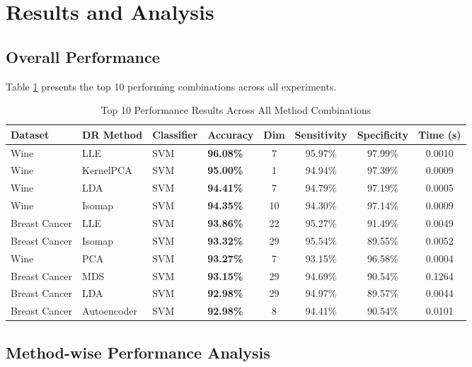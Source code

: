 \documentclass[12pt,a4paper]{article}
\begin{document}
\section{Results and Analysis}

\subsection{Overall Performance}

Table \ref{tab:top_results} presents the top 10 performing combinations across all experiments.

\begin{table}[H]
\centering
\caption{Top 10 Performance Results Across All Method Combinations}
\label{tab:top_results}
\scriptsize
\begin{tabular}{llllcccc}
\toprule
\textbf{Dataset} & \textbf{DR Method} & \textbf{Classifier} & \textbf{Accuracy} & \textbf{Dim} & \textbf{Sensitivity} & \textbf{Specificity} & \textbf{Time (s)} \\
\midrule
Wine & LLE & SVM & \textbf{96.08\%} & 7 & 95.97\% & 97.99\% & 0.0010 \\
Wine & KernelPCA & SVM & \textbf{95.00\%} & 1 & 94.94\% & 97.39\% & 0.0009 \\
Wine & LDA & SVM & \textbf{94.41\%} & 7 & 94.79\% & 97.19\% & 0.0005 \\
Wine & Isomap & SVM & \textbf{94.35\%} & 10 & 94.30\% & 97.14\% & 0.0009 \\
Breast Cancer & LLE & SVM & \textbf{93.86\%} & 22 & 95.27\% & 91.49\% & 0.0049 \\
Breast Cancer & Isomap & SVM & \textbf{93.32\%} & 29 & 95.54\% & 89.55\% & 0.0052 \\
Wine & PCA & SVM & \textbf{93.27\%} & 7 & 93.15\% & 96.58\% & 0.0004 \\
Breast Cancer & MDS & SVM & \textbf{93.15\%} & 29 & 94.69\% & 90.54\% & 0.1264 \\
Breast Cancer & LDA & SVM & \textbf{92.98\%} & 29 & 94.97\% & 89.57\% & 0.0044 \\
Breast Cancer & Autoencoder & SVM & \textbf{92.98\%} & 8 & 94.41\% & 90.54\% & 0.0101 \\
\bottomrule
\end{tabular}
\end{table}

\subsection{Method-wise Performance Analysis}
\end{document}
